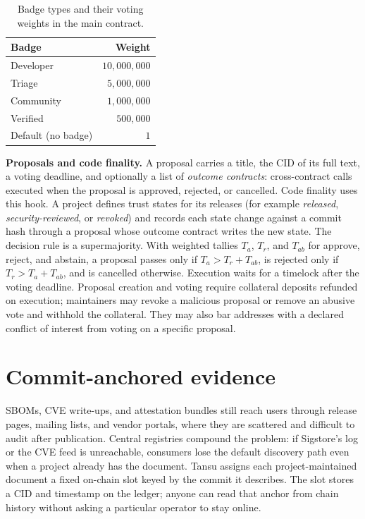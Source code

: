 \documentclass[11pt]{article}
\newcommand{\tansu}{Tansu}
\begin{document}
\begin{table}[t]
\centering
\caption{Badge types and their voting weights in the main contract.}
\label{tab:badges}
\begin{tabular}{lr}
\toprule
Badge & Weight \\
\midrule
Developer & $10{,}000{,}000$ \\
Triage    & $5{,}000{,}000$ \\
Community & $1{,}000{,}000$ \\
Verified  & $500{,}000$ \\
Default (no badge) & $1$ \\
\bottomrule
\end{tabular}
\end{table}

\noindent\textbf{Proposals and code finality.}
A proposal carries a title, the CID of its full text, a voting deadline, and
optionally a list of \emph{outcome contracts}: cross-contract calls executed
when the proposal is approved, rejected, or cancelled. Code finality uses this
hook. A project defines trust states for its releases (for example
\emph{released}, \emph{security-reviewed}, or \emph{revoked}) and records each
state change against a commit hash through a proposal whose outcome contract
writes the new state. The decision rule is a supermajority. With weighted
tallies $T_a$, $T_r$, and $T_{ab}$ for approve, reject, and abstain, a
proposal passes only if $T_a > T_r + T_{ab}$, is rejected only if
$T_r > T_a + T_{ab}$, and is cancelled otherwise.
Execution waits for a timelock after the voting deadline. Proposal creation and
voting require collateral deposits refunded on execution; maintainers may revoke
a malicious proposal or remove an abusive vote and withhold the collateral.
They may also bar addresses with a declared conflict of interest from voting on
a specific proposal.

\section{Commit-anchored evidence}
\label{sec:evidence}

SBOMs, CVE write-ups, and attestation bundles still reach users through
release pages, mailing lists, and vendor portals, where they are scattered and
difficult to audit after publication. Central registries compound the problem:
if Sigstore's log or the CVE feed is unreachable, consumers lose the default
discovery path even when a project already has the document. \tansu{} assigns
each project-maintained document a fixed on-chain slot keyed by the commit it
describes. The slot stores a CID and timestamp on the ledger; anyone can read
that anchor from chain history without asking a particular operator to stay
online.
\end{document}
